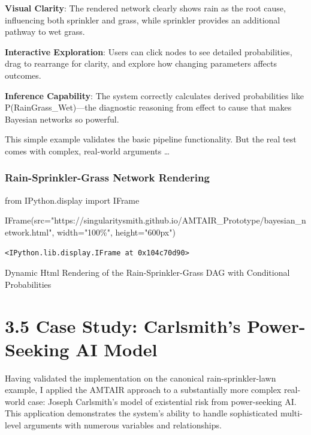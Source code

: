 \documentclass[
  11pt,
  letterpaper,
  openany]{book}
\newenvironment{Shaded}{\begin{snugshade}}{\end{snugshade}}
\newcommand{\ImportTok}[1]{\textcolor[rgb]{0.00,0.46,0.62}{#1}}
\newcommand{\NormalTok}[1]{\textcolor[rgb]{0.00,0.23,0.31}{#1}}
\newcommand{\OperatorTok}[1]{\textcolor[rgb]{0.37,0.37,0.37}{#1}}
\newcommand{\StringTok}[1]{\textcolor[rgb]{0.13,0.47,0.30}{#1}}
\begin{document}
\begin{landscape}
\textbf{Visual Clarity}: The rendered network clearly shows rain as the
root cause, influencing both sprinkler and grass, while sprinkler
provides an additional pathway to wet grass.

\textbf{Interactive Exploration}: Users can click nodes to see detailed
probabilities, drag to rearrange for clarity, and explore how changing
parameters affects outcomes.

\textbf{Inference Capability}: The system correctly calculates derived
probabilities like P(Rain\textbar Grass\_Wet)---the diagnostic reasoning
from effect to cause that makes Bayesian networks so powerful.

This simple example validates the basic pipeline functionality. But the
real test comes with complex, real-world arguments \ldots{}

\subsubsection{Rain-Sprinkler-Grass Network
Rendering}\label{rain-sprinkler-grass-network-rendering-1}

\begin{Shaded}
\begin{Highlighting}[]
\ImportTok{from}\NormalTok{ IPython.display }\ImportTok{import}\NormalTok{ IFrame}

\NormalTok{IFrame(src}\OperatorTok{=}\StringTok{"https://singularitysmith.github.io/AMTAIR\_Prototype/bayesian\_network.html"}\NormalTok{, width}\OperatorTok{=}\StringTok{"100\%"}\NormalTok{, height}\OperatorTok{=}\StringTok{"600px"}\NormalTok{)}
\end{Highlighting}
\end{Shaded}

\label{rain_sprinkler_grass_example_network_rendering2}
\begin{verbatim}
<IPython.lib.display.IFrame at 0x104c70d90>
\end{verbatim}

Dynamic Html Rendering of the Rain-Sprinkler-Grass DAG with Conditional
Probabilities

\end{landscape}

\section{3.5 Case Study: Carlsmith's Power-Seeking AI
Model}\label{sec-case-carlsmith}

Having validated the implementation on the canonical rain-sprinkler-lawn
example, I applied the AMTAIR approach to a substantially more complex
real-world case: Joseph Carlsmith's model of existential risk from
power-seeking AI. This application demonstrates the system's ability to
handle sophisticated multi-level arguments with numerous variables and
relationships.
\end{document}
